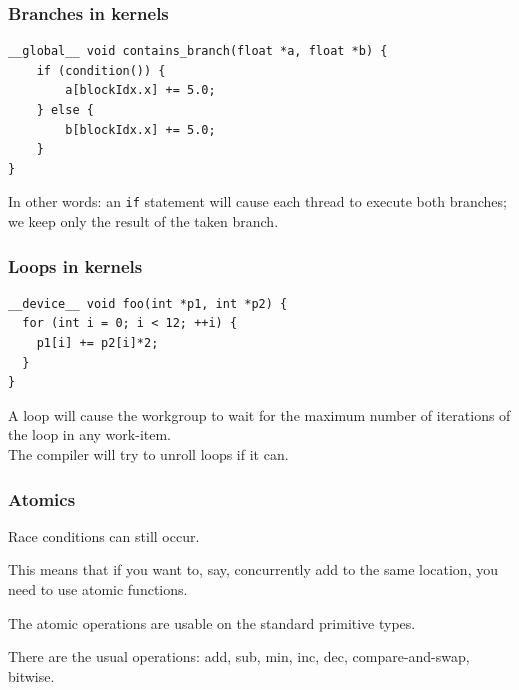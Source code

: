 \begin{frame}[fragile]
  \frametitle{Branches in kernels}

    \begin{lstlisting}
__global__ void contains_branch(float *a, float *b) {
    if (condition()) {
        a[blockIdx.x] += 5.0;
    } else {
        b[blockIdx.x] += 5.0;
    }
}
\end{lstlisting}

    
    In other words: an {\tt if} statement will cause each thread to execute
      both branches; we keep only the result of the taken branch.\\[1em]


\end{frame}

\begin{frame}[fragile]
  \frametitle{Loops in kernels}


    \begin{lstlisting}
__device__ void foo(int *p1, int *p2) {
  for (int i = 0; i < 12; ++i) {
    p1[i] += p2[i]*2;
  }
}
    \end{lstlisting}


    A loop will cause the workgroup to wait for the maximum number of
      iterations of the loop in any work-item.\\[1em]

The compiler will try to unroll loops if it can.

\end{frame}


\begin{frame}
\frametitle{Atomics}

Race conditions can still occur. 

This means that if you want to, say, concurrently add to the same location, you need to use atomic functions. 

The atomic operations are usable on the standard primitive types.

There are the usual operations: add, sub, min, inc, dec, compare-and-swap, bitwise.

\end{frame}


